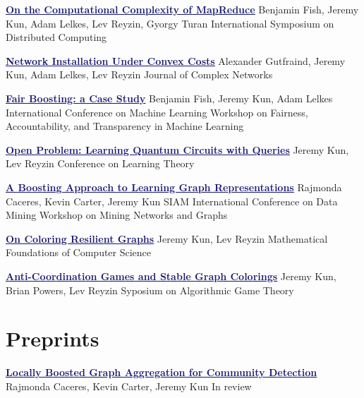 \documentclass[11pt]{moderncv}
\begin{document}
         {\href{http://arxiv.org/abs/1410.0245}{\textcolor{MidnightBlue}{\underline{\textbf{On the Computational Complexity of MapReduce}}}}}
      {Benjamin Fish, Jeremy Kun, Adam Lelkes, Lev Reyzin, Gyorgy Turan}
      {International Symposium on Distributed Computing}
      {}
      {}

         {\href{http://comnet.oxfordjournals.org/cgi/content/abstract/cnv020?ijkey=ZiDO26VV0vKrRIO&keytype=ref}{\textcolor{MidnightBlue}{\underline{\textbf{Network Installation Under Convex Costs}}}}}
      {Alexander Gutfraind, Jeremy Kun, Adam Lelkes, Lev Reyzin}
      {Journal of Complex Networks}
      {}
      {}

         {\href{http://www.fatml.org/papers/Fish_Kun_Lelkes.pdf}{\textcolor{MidnightBlue}{\underline{\textbf{Fair Boosting: a Case Study}}}}}
      {Benjamin Fish, Jeremy Kun, Adam Lelkes}
      {International Conference on Machine Learning Workshop on Fairness, Accountability, and Transparency in Machine Learning}
      {}
      {}

         {\href{http://jmlr.org/proceedings/papers/v40/Kun15.html}{\textcolor{MidnightBlue}{\underline{\textbf{Open Problem: Learning Quantum Circuits with Queries}}}}}
      {Jeremy Kun, Lev Reyzin}
      {Conference on Learning Theory}
      {}
      {}

         {\href{http://arxiv.org/abs/1401.3258}{\textcolor{MidnightBlue}{\underline{\textbf{A Boosting Approach to Learning Graph Representations}}}}}
      {Rajmonda Caceres, Kevin Carter, Jeremy Kun}
      {SIAM International Conference on Data Mining Workshop on Mining Networks and Graphs}
      {}
      {}

         {\href{http://arxiv.org/abs/1402.4376}{\textcolor{MidnightBlue}{\underline{\textbf{On Coloring Resilient Graphs}}}}}
      {Jeremy Kun, Lev Reyzin}
      {Mathematical Foundations of Computer Science}
      {}
      {}

         {\href{http://arxiv.org/abs/1308.3258}{\textcolor{MidnightBlue}{\underline{\textbf{Anti-Coordination Games and Stable Graph Colorings}}}}}
      {Jeremy Kun, Brian Powers, Lev Reyzin}
      {Syposium on Algorithmic Game Theory}
      {}
      {}


   \section{Preprints}
         \cventry{}
         {\href{http://arxiv.org/abs/1405.3210}{\textcolor{MidnightBlue}{\underline{\textbf{Locally Boosted Graph Aggregation for Community Detection}}}}}
      {}
      {Rajmonda Caceres, Kevin Carter, Jeremy Kun}
      {}
      {In review}
\end{document}
